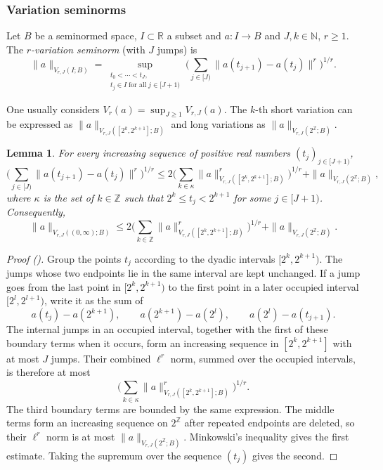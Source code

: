 \documentclass[12pt,reqno]{amsart}
\newcommand{\auto}{{({\tiny\faCar})}}
\theoremstyle{plain}
\newtheorem{lemma}[theorem]{Lemma}
\numberwithin{equation}{section}
\theoremstyle{remark}
\newcommand{\Z}{{\mathbb Z}}
\begin{document}
\subsubsection{Variation seminorms}\label{sec:variation-norm}

Let $B$ be a seminormed space, $I\subset\mathbb{R}$ a subset and $a:I\to B$ and $J,k\in\mathbb{N}$, $r\ge 1$. The \emph{$r$-variation seminorm} (with $J$ jumps) is
\begin{equation}\label{auto:finite-variation-seminorm} \|a\|_{V_{r,J}(I; B)} = \sup_{\substack{t_0<\cdots<t_J,\\t_j\in I\;\text{for all}\;j\in [J+1)}} \Big(\sum_{j\in[J)} \|a(t_{j+1})- a(t_{j})\|^r\Big)^{1/r}. \end{equation}

One usually considers $V_r(a)=\sup_{J\ge 1} V_{r,J}(a)$.
The $k$-th short variation can be expressed as
$\|a\|_{V_{r,J}([2^k, 2^{k+1}]; B)}$
and long variations as
$\|a\|_{V_{r,J}(2^\mathbb{Z}; B)}.$


\begin{lemma}\label{lem:shortlongjumps}
For every increasing sequence of positive real numbers $(t_j)_{j\in[J+1)}$,
\begin{equation}\label{auto:short-long-variation-decomposition}
\Big(\sum_{j\in[J)}\|a(t_{j+1})-a(t_j)\|^r\Big)^{1/r}
\le
2\Big(\sum_{k\in\kappa}\|a\|_{V_{r,J}([2^k,2^{k+1}];B)}^r\Big)^{1/r}
+\|a\|_{V_{r,J}(2^\Z;B)},
\end{equation}
where $\kappa$ is the set of $k\in\Z$ such that $2^k\le t_j<2^{k+1}$ for some $j\in[J+1)$. Consequently,
\begin{equation}\label{auto:global-short-long-variation-bound}
\|a\|_{V_{r,J}((0,\infty);B)}
\le
2\Big(\sum_{k\in\Z}\|a\|_{V_{r,J}([2^k,2^{k+1}];B)}^r\Big)^{1/r}
+\|a\|_{V_{r,J}(2^\Z;B)}.
\end{equation}
\end{lemma}
\begin{proof}[Proof \auto]
Group the points $t_j$ according to the dyadic intervals $[2^k,2^{k+1})$. The jumps whose two endpoints lie in the same interval are kept unchanged. If a jump goes from the last point in $[2^k,2^{k+1})$ to the first point in a later occupied interval $[2^l,2^{l+1})$, write it as the sum of
\[
a(t_j)-a(2^{k+1}),
\qquad
a(2^{k+1})-a(2^l),
\qquad
a(2^l)-a(t_{j+1}).
\]
The internal jumps in an occupied interval, together with the first of these boundary terms when it occurs, form an increasing sequence in $[2^k,2^{k+1}]$ with at most $J$ jumps. Their combined $\ell^r$ norm, summed over the occupied intervals, is therefore at most
\[
\Big(\sum_{k\in\kappa}\|a\|_{V_{r,J}([2^k,2^{k+1}];B)}^r\Big)^{1/r}.
\]
The third boundary terms are bounded by the same expression. The middle terms form an increasing sequence on $2^\Z$ after repeated endpoints are deleted, so their $\ell^r$ norm is at most $\|a\|_{V_{r,J}(2^\Z;B)}$. Minkowski's inequality gives the first estimate. Taking the supremum over the sequence $(t_j)$ gives the second.
\end{proof}
\end{document}
